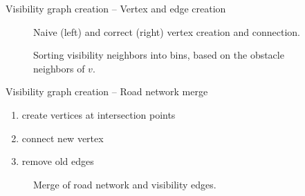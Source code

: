 \documentclass[xcolor={x11names}]{beamer}
\newenvironment{figcenter}
{%
	\parskip=0pt%
	\par%
	\nopagebreak%
	\centering%
}%
{%
	\par%
	\noindent%
	\ignorespacesafterend%
}
\begin{document}
		\begin{frame}{Visibility graph creation -- Vertex and edge creation}
			\begin{figure}
				\begin{figcenter}
					\scalebox{0.7}
					{
						
					}
					\hspace{0.75cm}
					\scalebox{0.7}
					{
						
					}
				\end{figcenter}
				\caption{Naive (left) and correct (right) vertex creation and connection.}
			\end{figure}
			\pause
			\begin{figure}
				\begin{figcenter}
					\scalebox{0.7}
					{
						
					}
				\end{figcenter}
				\caption{Sorting visibility neighbors into bins, based on the obstacle neighbors of $v$.}
			\end{figure}
		\end{frame}
		
		\begin{frame}{Visibility graph creation -- Road network merge}
			\begin{enumerate}
				\item create vertices at intersection points
				\item connect new vertex
				\item remove old edges
			\end{enumerate}
			\begin{figure}
				\begin{figcenter}
					\scalebox{0.7}
					{
						
					}
					\hspace{0.75cm}
					\scalebox{0.7}
					{
						
					}
				\end{figcenter}
				\caption{Merge of road network and visibility edges.}
			\end{figure}
		\end{frame}
		
\end{document}
